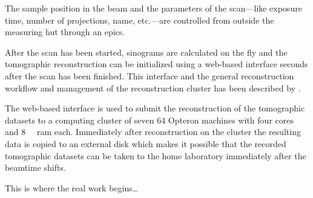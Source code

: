 The sample position in the beam and the parameters of the scan---like exposure time, number of projections, name, etc.---are controlled from outside the measuring hut through an \ac{epics}.

After the scan has been started, sinograms are calculated on the fly and the tomographic reconstruction can be initialized using a web-based interface seconds after the scan has been finished. This interface and the general reconstruction workflow and management of the reconstruction cluster has been described by \citet{Hintermueller2010}.

The web-based interface is used to submit the reconstruction of the tomographic datasets to a computing cluster of seven \SI{64}{\bit} Opteron machines with four cores and \SI{8}{\giga\byte} \acs{ram} each. Immediately after reconstruction on the cluster the resulting data is copied to an external disk which makes it possible that the recorded tomographic datasets can be taken to the home laboratory immediately after the beamtime shifts.

This is where the real work begins\ldots

